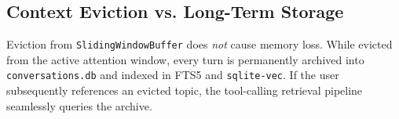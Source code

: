 \subsection{Context Eviction vs. Long-Term Storage}
Eviction from \texttt{SlidingWindowBuffer} does \emph{not} cause memory loss. While evicted from the active attention window, every turn is permanently archived into \texttt{conversations.db} and indexed in FTS5 and \texttt{sqlite-vec}. If the user subsequently references an evicted topic, the tool-calling retrieval pipeline seamlessly queries the archive.
